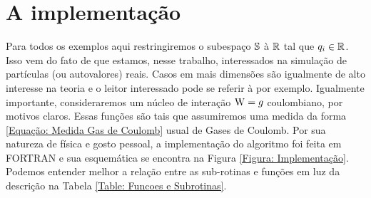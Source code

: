 \section{A implementação}

Para todos os exemplos aqui restringiremos o subespaço $\mathbb{S}$ à $\mathbb{R}$ tal que $q_i \in \mathbb{R}$. Isso vem do fato de que estamos, nesse trabalho, interessados na simulação de partículas (ou autovalores) reais. Casos em mais dimensões são igualmente de alto interesse na teoria e o leitor interessado pode se referir à \cite{NAO SEI} por exemplo. Igualmente importante, consideraremos um núcleo de interação $\operatorname{W} = g$ coulombiano, por motivos claros. Essas funções são tais que assumiremos uma medida da forma \ref{Equação: Medida Gas de Coulomb} usual de Gases de Coulomb. Por sua natureza de física e gosto pessoal, a implementação do algoritmo foi feita em FORTRAN e sua esquemática se encontra na Figura \ref{Figura: Implementação}. Podemos entender melhor a relação entre as sub-rotinas e funções em luz da descrição na Tabela \ref{Table: Funcoes e Subrotinas}.
